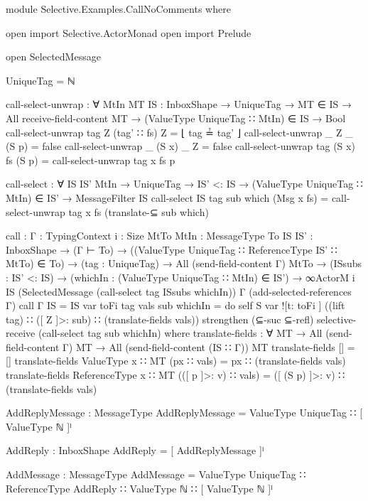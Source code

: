 \begin{code}
module Selective.Examples.CallNoComments where

open import Selective.ActorMonad
open import Prelude

open SelectedMessage

UniqueTag = ℕ

call-select-unwrap : ∀ {MtIn MT} {IS : InboxShape} →
                        UniqueTag →
                        MT ∈ IS →
                        All receive-field-content MT →
                        (ValueType UniqueTag ∷ MtIn) ∈ IS →
                        Bool
call-select-unwrap tag Z (tag' ∷ fs) Z = ⌊ tag ≟ tag' ⌋
call-select-unwrap _ Z _ (S p) = false
call-select-unwrap _ (S x) _ Z = false
call-select-unwrap tag (S x) fs (S p) = call-select-unwrap tag x fs p

call-select : ∀ {IS IS' MtIn} →
                UniqueTag →
                IS' <: IS →
                (ValueType UniqueTag ∷ MtIn) ∈ IS' →
                MessageFilter IS
call-select {IS} tag sub which (Msg x fs) =
  call-select-unwrap tag x fs (translate-⊆  sub which)

call : {Γ : TypingContext} {i : Size}
        {MtTo MtIn : MessageType}
        {To IS IS' : InboxShape} →
        (Γ ⊢ To) →
        ((ValueType UniqueTag ∷ ReferenceType IS' ∷ MtTo) ∈ To) →
        (tag : UniqueTag) →
        All (send-field-content Γ) MtTo →
        (ISsubs : IS' <: IS) →
        (whichIn : (ValueType UniqueTag ∷ MtIn) ∈ IS') →
        ∞ActorM i IS
          (SelectedMessage (call-select tag ISsubs whichIn))
          Γ (add-selected-references Γ)
call {Γ} {IS = IS} var toFi tag vals sub whichIn =
  do
      self
      S var ![t: toFi ] ((lift tag) ∷ ([ Z ]>: sub) ∷ (translate-fields vals))
      strengthen (⊆-suc ⊆-refl)
      selective-receive (call-select tag sub whichIn)
  where
    translate-fields : ∀ {MT} →
                        All (send-field-content Γ) MT →
                        All (send-field-content (IS ∷ Γ)) MT
    translate-fields [] = []
    translate-fields {ValueType x ∷ MT} (px ∷ vals) =
      px ∷ (translate-fields vals)
    translate-fields {ReferenceType x ∷ MT} (([ p ]>: v) ∷ vals) =
      ([ (S p) ]>: v) ∷ (translate-fields vals)

AddReplyMessage : MessageType
AddReplyMessage = ValueType UniqueTag ∷ [ ValueType ℕ ]ˡ

AddReply : InboxShape
AddReply = [ AddReplyMessage ]ˡ

AddMessage : MessageType
AddMessage = ValueType UniqueTag ∷ ReferenceType AddReply ∷ ValueType ℕ ∷ [ ValueType ℕ ]ˡ


\end{code}
